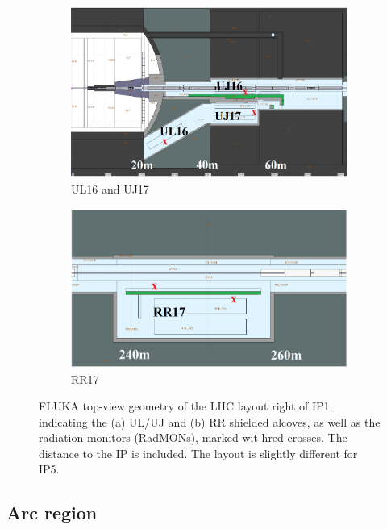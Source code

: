 \documentclass[encoding=utf8,british]{tumphthesis}
\begin{document}
\begin{figure}[H]
\centering
\begin{subfigure}{.4625\textwidth}
  \centering
  \includegraphics[width=1.0\linewidth]{figures/fluka_uj.png}
  \caption{UL16 and UJ17}
  \label{fig:sub1}
\end{subfigure}%
\begin{subfigure}{.5\textwidth}
  \centering
  \includegraphics[width=1.0\linewidth]{figures/fluka_rr17.png}
  \caption{RR17}
  \label{fig:sub2}
\end{subfigure}
\caption{FLUKA top-view geometry of the LHC layout right of IP1, indicating the (a) UL/UJ and  (b) RR shielded alcoves, as well as the radiation monitors (RadMONs), marked wit hred crosses. The distance to the IP is included. The layout is slightly different for IP5. \cite{GarcíaAlía:2310128}}
\label{fig:shileded-alcoves}
\end{figure}


\subsection{Arc region}
\end{document}
